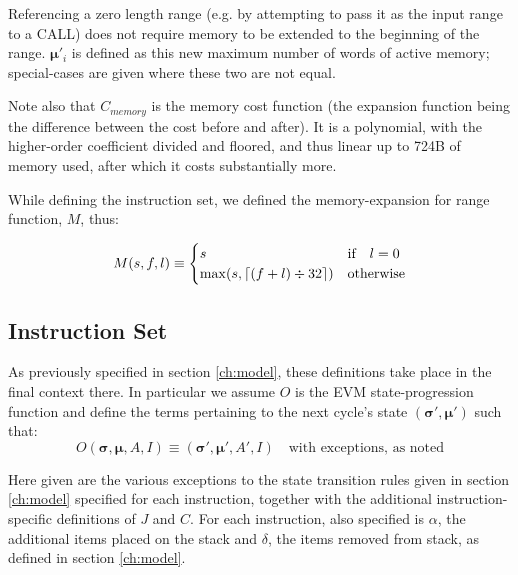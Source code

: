 \documentclass[9pt,oneside]{amsart}
\DeclarePairedDelimiter{\ceil}{\lceil}{\rceil}
\begin{document}
Referencing a zero length range (e.g. by attempting to pass it as the input range to a CALL) does not require memory to be extended to the beginning of the range. $\boldsymbol{\mu}'_i$ is defined as this new maximum number of words of active memory; special-cases are given where these two are not equal.

Note also that $C_{memory}$ is the memory cost function (the expansion function being the difference between the cost before and after). It is a polynomial, with the higher-order coefficient divided and floored, and thus linear up to 724B of memory used, after which it costs substantially more.

While defining the instruction set, we defined the memory-expansion for range function, $M$, thus:

\begin{equation}
M(s, f, l) \equiv \begin{cases}
s & \text{if} \quad l = 0 \\
\max(s, \ceil{ (f + l) \div 32 }) & \text{otherwise}
\end{cases}
\end{equation}

\subsection{Instruction Set}

As previously specified in section \ref{ch:model}, these definitions take place in the final context there. In particular we assume $O$ is the EVM state-progression function and define the terms pertaining to the next cycle's state $(\boldsymbol{\sigma}', \boldsymbol{\mu}')$ such that:
\begin{equation}
O(\boldsymbol{\sigma}, \boldsymbol{\mu}, A, I) \equiv (\boldsymbol{\sigma}', \boldsymbol{\mu}', A', I) \quad \text{with exceptions, as noted}
\end{equation}

Here given are the various exceptions to the state transition rules given in section \ref{ch:model} specified for each instruction, together with the additional instruction-specific definitions of $J$ and $C$. For each instruction, also specified is $\alpha$, the additional items placed on the stack and $\delta$, the items removed from stack, as defined in section \ref{ch:model}.
\end{document}
